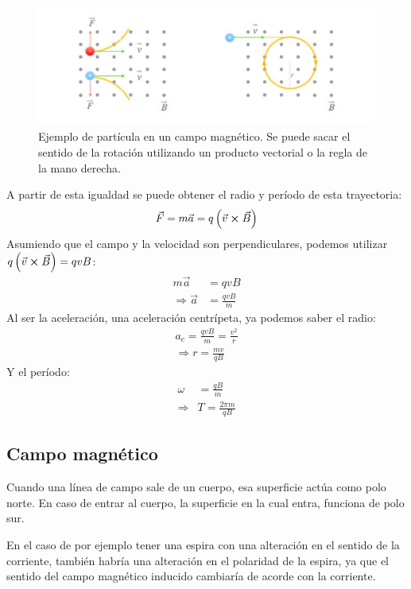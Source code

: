 \documentclass[arial,a4paper,print]{article}
\begin{document}
\begin{figure}[H]
	\centering
	\includegraphics[width=0.7\linewidth]{figures/particula_con_B}
	\caption{Ejemplo de partícula en un campo magnético. Se puede sacar el sentido de la rotación utilizando un producto vectorial o la regla de la mano derecha. }
	\label{fig:particulaconb}
\end{figure}

A partir de esta igualdad se puede obtener el radio y período de esta trayectoria:
\begin{align*}
	\vec{F} = m\vec{a} &= q\left(\vec{v}\cross\vec{B}\right)  \\
\end{align*}
Asumiendo que el campo y la velocidad son perpendiculares, podemos utilizar $q\left(\vec{v}\cross\vec{B}\right) = qvB$:
\begin{align*}
	m\vec{a} &= qvB \\
	\Rightarrow \vec{a} &= \frac{qvB}{m}
\end{align*}
Al ser la aceleración, una aceleración centrípeta, ya podemos saber el radio:
\begin{align*}
	a_{c} = \frac{qvB}{m} = \frac{v^{2}}{r} \\
	\Rightarrow r = \frac{mv}{qB}
\end{align*}
Y el período:
\begin{align*}
	\omega &= \frac{qB}{m} \\
	\Rightarrow & T = \frac{2\pi m}{qB}
\end{align*}

\subsection{Campo magnético}

Cuando una línea de campo sale de un cuerpo, esa superficie actúa como polo norte. En caso de entrar al cuerpo, la superficie en la cual entra, funciona de polo sur. 

En el caso de por ejemplo tener una espira con una alteración en el sentido de la corriente, también habría una alteración en el polaridad de la espira, ya que el sentido del campo magnético inducido cambiaría de acorde con la corriente. 
\end{document}
